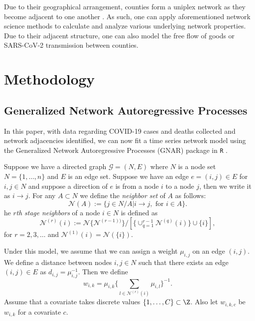 Due to their geographical arrangement, counties form a uniplex network as they become adjacent to one another \cite{bergs2011social}.  As such, one can apply aforementioned network science methods to calculate and analyze various underlying network properties.  Due to their adjacent structure, one can also model the free flow of goods or {SARS-CoV-2} transmission between counties.  

\section{Methodology}\label{subsection:modelparam}

\subsection{Generalized Network Autoregressive Processes}

In this paper, with data regarding COVID-19 cases and deaths collected and network adjacencies identified, we can now fit a time series network model using the Generalized Network Autoregressive Processes (GNAR) package in \texttt{R} \cite{GNARCRAN}.  

Suppose we have a directed graph $\mathcal{G} = (N, E)$ where $N$ is a node set $N = \{1, \ldots, n\}$ and $E$ is an edge set.  Suppose we have an edge $e = (i, j) \in E$ for $i, j \in N$ and suppose a direction of $e$ is from a node $i$ to a node $j$, then we write it as $i \to j$.  For any $A \subset N$ we define the {\em neighbor set} of $A$ as follows:
\[
\mathcal{N}(A) := \{j \in N/A| i \to j , \mbox{ for } i \in A\}.
\]
he {\em $r$th stage neighbors} of a node $i \in N$ is defined as
\[
\mathcal{N}^{(r)}(i) := \mathcal{N}\{\mathcal{N}^{(r-1))}\}/[\{\cup_{q = 1}^{r-1}\mathcal{N}^{(q)}(i)\}\cup \{i\}],
\]
for $r = 2, 3, \ldots$ and $\mathcal{N}^{(1)}(i) = \mathcal{N}(\{i\})$. 

Under this model, we assume that we can assign a weight $\mu_{i, j}$ on an edge $(i, j)$.  We define a distance between nodes $i, j \in N$ such that there exists an edge $(i, j) \in E$ as $d_{i, j} = \mu_{i, j}^{-1}$.  Then we define  
\[
w_{i, k} =\mu_{i, k} \{\sum_{l \in \mathcal{N}^{(r)}(i)} \mu_{i, l}\}^{-1}.
\]
Assume that a covariate takes discrete values $\{1, \ldots , C\} \subset \Z$.  Also let $w_{i, k, c}$ be $w_{i, k}$ for a covariate $c$.  

